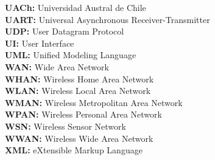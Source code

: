 \begin{spacing}{1.2}
\textbf{UACh:} Universidad Austral de Chile\\
\textbf{UART:} Universal Asynchronous Receiver-Transmitter\\
\textbf{UDP:} User Datagram Protocol\\
\textbf{UI:} User Interface\\
\textbf{UML:} Unified Modeling Language\\
\textbf{WAN:} Wide Area Network\\
\textbf{WHAN:} Wireless Home Area Network\\
\textbf{WLAN:} Wireless Local Area Network\\
\textbf{WMAN:} Wireless Metropolitan Area Network\\
\textbf{WPAN:} Wireless Personal Area Network\\
\textbf{WSN:} Wireless Sensor Network\\
\textbf{WWAN:} Wireless Wide Area Network\\
\textbf{XML:} eXtensible Markup Language\\
\end{spacing}


